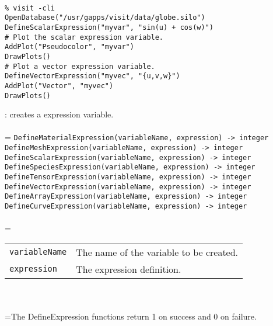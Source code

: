 \documentclass[10pt,a4paper]{report}
\begin{document}
\\[-6mm]
\begin{verbatim}% visit -cli
OpenDatabase("/usr/gapps/visit/data/globe.silo")
DefineScalarExpression("myvar", "sin(u) + cos(w)")
# Plot the scalar expression variable.
AddPlot("Pseudocolor", "myvar")
DrawPlots()
# Plot a vector expression variable.
DefineVectorExpression("myvec", "{u,v,w}")
AddPlot("Vector", "myvec")
DrawPlots()
\end{verbatim}
\newpage


{}
: creates a expression variable.\\[-3mm]

 \\ 
\hangindent=\parindent 
\verb!DefineMaterialExpression(variableName, expression) -> integer!\\ 
\verb!DefineMeshExpression(variableName, expression) -> integer!\\ 
\verb!DefineScalarExpression(variableName, expression) -> integer!\\ 
\verb!DefineSpeciesExpression(variableName, expression) -> integer!\\ 
\verb!DefineTensorExpression(variableName, expression) -> integer!\\ 
\verb!DefineVectorExpression(variableName, expression) -> integer!\\ 
\verb!DefineArrayExpression(variableName, expression) -> integer!\\ 
\verb!DefineCurveExpression(variableName, expression) -> integer!\\ [-3mm]

 \\ 
\hangindent=\parindent 
\begin{tabular}{ll}
\verb!variableName! & The name of the variable to be created. \\
\verb!expression! & The expression definition. \\
\end{tabular} \\[-2mm]


 \\ 
\hangindent=\parindent The DefineExpression functions return 1 on success and 0 on failure. \\[-3mm] 
\end{document}
